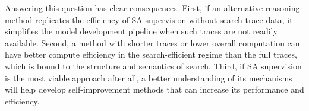 Answering this question has clear consequences.
First, if an alternative reasoning method replicates the efficiency of SA supervision without search trace data, it simplifies the model development pipeline when such traces are not readily available.
Second, a method with shorter traces or lower overall computation can have better compute efficiency in the search-efficient regime than the full traces, which is bound to the structure and semantics of search.
Third, if SA supervision is the most viable approach after all, a better understanding of its mechanisms will help develop self-improvement methods that can increase its performance and efficiency.


